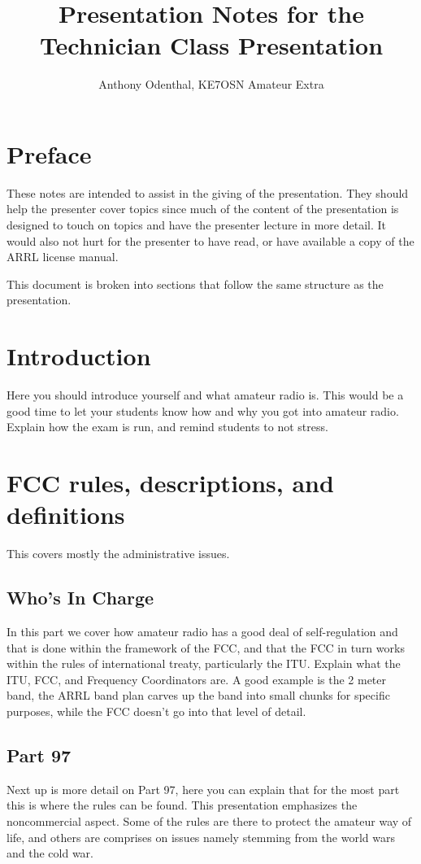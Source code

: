 \documentclass[12pt,letterpaper]{report}
\author{Anthony Odenthal, KE7OSN Amateur Extra}
\title{Presentation Notes for the Technician Class Presentation}
\begin{document}
\section*{Preface}
These notes are intended to assist in the giving of the presentation. They should help the presenter cover topics since much of the content of the presentation is designed to touch on topics and have the presenter lecture in more detail. It would also not hurt for the presenter to have read, or have available a copy of the ARRL license manual.

This document is broken into sections that follow the same structure as the presentation.

\section*{Introduction}
Here you should introduce yourself and what amateur radio is. This would be a good time to let your students know how and why you got into amateur radio. Explain how the exam is run, and remind students to not stress.

\section*{FCC rules, descriptions, and definitions}
This covers mostly the administrative issues.

\subsection*{Who's In Charge}
In this part we cover how amateur radio has a good deal of self-regulation and that is done within the framework of the FCC, and that the FCC in turn works within the rules of international treaty, particularly the ITU. Explain what the ITU, FCC, and Frequency Coordinators are. A good example is the 2 meter band, the ARRL band plan carves up the band into small chunks for specific purposes, while the FCC doesn't go into that level of detail.

\subsection*{Part 97}
Next up is more detail on Part 97, here you can explain that for the most part this is where the rules can be found. This presentation emphasizes the noncommercial aspect. Some of the rules are there to protect the amateur way of life, and others are comprises on issues namely stemming from the world wars and the cold war.
\end{document}
